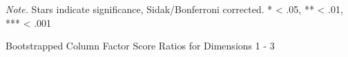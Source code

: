 \documentclass[
]{article}
\begin{document}
\begin{table}[tbp]
\begin{center}
\begin{threeparttable}
\begin{tablenotes}[para]
\normalsize{\textit{Note.} Stars indicate significance, Sidak/Bonferroni corrected. 
* < .05, ** < .01, *** < .001}
\end{tablenotes}

\end{threeparttable}
\end{center}

\end{table}

\begin{table}[tbp]

\begin{center}
\begin{threeparttable}

\caption{\label{tab:Q.bootj.table}Bootstrapped Column Factor Score Ratios for Dimensions 1 - 3}

\footnotesize{

}
\end{threeparttable}
\end{center}
\end{table}
\end{document}
